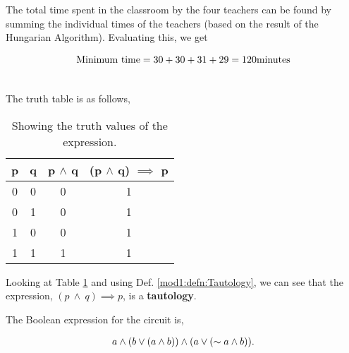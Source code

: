 \begin{subquestions}
\begin{subsubquestions}
		\subsubquestion
		
		The total time spent in the classroom by the four teachers can be found by summing the individual times of the teachers (based on the result of the Hungarian Algorithm). Evaluating this, we get
		
		\begin{align}
			\text{Minimum time} = 30+30+31+29 = 120 \text{minutes} \\ \nonumber 
		\end{align}	
	\end{subsubquestions}
	
	
	\subquestion
	
	The truth table is as follows,
	
	\begin{table}[ht]
		\centering
		\begin{tabular}{|c|c|c|c|}
			\hline
			p & q & p $\land$ q & (p $\land$ q) $\implies$ p \\
			\hline
			0 & 0 & 0 & 1 \\
			0 & 1 & 0 & 1 \\
			1 & 0 & 0 & 1 \\
			1 & 1 & 1 & 1 \\
			\hline
		\end{tabular}
		\caption{\label{2015:q2:tab:TrthTab} Showing the truth values of the expression.}
	\end{table}        
	
	Looking at Table \ref{2015:q2:tab:TrthTab} and using Def. \ref{mod1:defn:Tautology}, we can see that the expression, $(p \: \land \: q) \implies p$, is a \textbf{tautology}.  \\
	
	
	\subquestion
	
	\begin{subsubquestions}
		
		\subsubquestion
		
		The Boolean expression for the circuit is,
		
		\begin{align}
			a \land (b \lor (a \land b)) \land (a \lor (\sim a \land b)).\\ \nonumber
		\end{align}	
		

\end{subsubquestions}
\end{subquestions}
